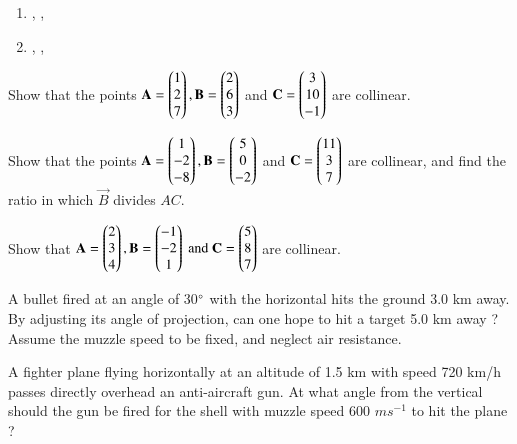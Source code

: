 \begin{enumerate}
\item {},  ,   
\item {},  ,   
\end{enumerate}

\item Show that the points 
$\mathbf{A}=\begin{pmatrix}1\\2\\7\end{pmatrix}, \mathbf{B}=\begin{pmatrix}2\\6\\3\end{pmatrix}$ and $ \mathbf{C}=\begin{pmatrix}3\\10\\-1\end{pmatrix}$ are collinear.
\item Show that the points 
$\mathbf{A}=\begin{pmatrix}1\\-2\\-8\end{pmatrix}, \mathbf{B}=\begin{pmatrix}5\\0\\-2\end{pmatrix}$ and $ \mathbf{C}=\begin{pmatrix}11\\3\\7\end{pmatrix}$ are collinear, and find the ratio in which $\vec{B}$ divides $AC$.
\\
\solution

\item Show that 
$
\mathbf{A}=\begin{pmatrix}2\\3\\4\end{pmatrix}, 
\mathbf{B}=\begin{pmatrix}-1\\-2\\1\end{pmatrix} \text{ and } 
\mathbf{C}=\begin{pmatrix}5\\8\\7\end{pmatrix}$  
are collinear.
\\
\solution

\item A bullet fired at an angle of 30$\degree$ with the horizontal hits the ground 3.0 km away. By adjusting its angle of projection, can one hope to hit a target 5.0 km away ? Assume the muzzle speed to be fixed, and neglect air resistance.
\item  A fighter plane flying horizontally at an altitude of 1.5 km with speed 720 km/h passes directly overhead an anti-aircraft gun. At what angle from the vertical should the gun be fired for the shell with muzzle speed 600 $m s^{-1}$ to hit the plane ? 
